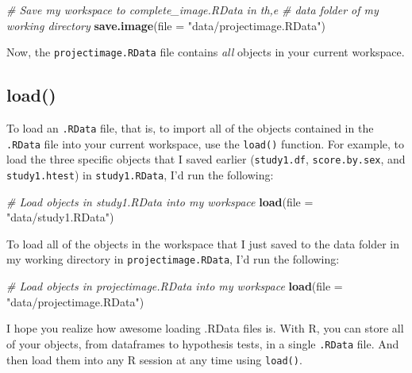 \documentclass[]{book}
\newenvironment{Shaded}{\begin{snugshade}}{\end{snugshade}}
\newcommand{\KeywordTok}[1]{\textcolor[rgb]{0.13,0.29,0.53}{\textbf{#1}}}
\newcommand{\DataTypeTok}[1]{\textcolor[rgb]{0.13,0.29,0.53}{#1}}
\newcommand{\StringTok}[1]{\textcolor[rgb]{0.31,0.60,0.02}{#1}}
\newcommand{\CommentTok}[1]{\textcolor[rgb]{0.56,0.35,0.01}{\textit{#1}}}
\newcommand{\NormalTok}[1]{#1}
\theoremstyle{definition}
\theoremstyle{definition}
\theoremstyle{remark}
\begin{document}
\begin{Shaded}
\begin{Highlighting}[]
\CommentTok{# Save my workspace to complete_image.RData in th,e}
\CommentTok{#  data folder of my working directory}
\KeywordTok{save.image}\NormalTok{(}\DataTypeTok{file =} \StringTok{"data/projectimage.RData"}\NormalTok{)}
\end{Highlighting}
\end{Shaded}

Now, the \texttt{projectimage.RData} file contains \emph{all} objects in
your current workspace.

\subsection{load()}\label{load}

To load an \texttt{.RData} file, that is, to import all of the objects
contained in the \texttt{.RData} file into your current workspace, use
the \texttt{load()} function. For example, to load the three specific
objects that I saved earlier (\texttt{study1.df}, \texttt{score.by.sex},
and \texttt{study1.htest}) in \texttt{study1.RData}, I'd run the
following:

\begin{Shaded}
\begin{Highlighting}[]
\CommentTok{# Load objects in study1.RData into my workspace}
\KeywordTok{load}\NormalTok{(}\DataTypeTok{file =} \StringTok{"data/study1.RData"}\NormalTok{)}
\end{Highlighting}
\end{Shaded}

To load all of the objects in the workspace that I just saved to the
data folder in my working directory in \texttt{projectimage.RData}, I'd
run the following:

\begin{Shaded}
\begin{Highlighting}[]
\CommentTok{# Load objects in projectimage.RData into my workspace}
\KeywordTok{load}\NormalTok{(}\DataTypeTok{file =} \StringTok{"data/projectimage.RData"}\NormalTok{)}
\end{Highlighting}
\end{Shaded}

I hope you realize how awesome loading .RData files is. With R, you can
store all of your objects, from dataframes to hypothesis tests, in a
single \texttt{.RData} file. And then load them into any R session at
any time using \texttt{load()}.
\end{document}
